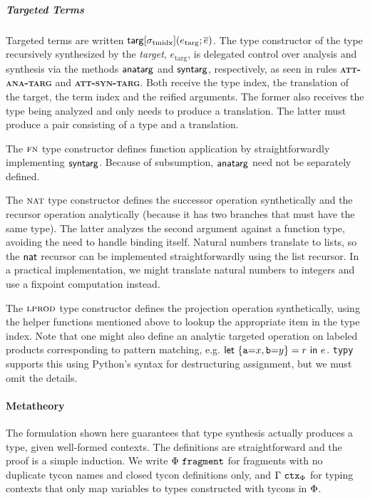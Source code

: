 \documentclass{sigplanconf}
\newcommand{\sigmat}[1]{\sigma_{\text{#1}}}
\newcommand{\FF}[1]{{\sf #1}}
\newcommand{\rulename}[1]{{\textsc{\textbf{#1}}}}
\begin{document}
\subparagraph{Targeted Terms} Targeted terms are written $\FF{targ}[\sigmat{tmidx}](e_\text{targ}; \overline{e})$. The type constructor of the type recursively synthesized by the \emph{target}, $e_\text{targ}$, is delegated control over analysis and synthesis via the methods $\FF{anatarg}$ and $\FF{syntarg}$, respectively, as seen in rules \rulename{att-ana-targ} and \rulename{att-syn-targ}. Both receive the type index, the translation of the target, the term index and the reified arguments. The former also receives the type being analyzed and only needs to produce a translation. The latter must produce a pair consisting of a type and a translation.

The $\textsc{fn}$ type constructor defines function application by straightforwardly implementing $\FF{syntarg}$.  Because of subsumption, $\FF{anatarg}$ need not be separately defined.

The $\textsc{nat}$ type constructor defines the successor operation synthetically and the recursor operation analytically (because it has two branches that must have the same type). The latter analyzes the second argument against a function type, avoiding the need to handle binding itself. Natural numbers translate to lists, so the $\FF{nat}$ recursor can be implemented straightforwardly using the list recursor. In a practical implementation, we might translate natural numbers to integers and use a fixpoint computation instead.

The $\textsc{lprod}$ type constructor defines the projection operation synthetically, using the helper functions mentioned above to lookup the appropriate item in the type index. Note that one might also define an analytic targeted operation on labeled products corresponding to pattern matching, e.g. $\FF{let}~\{\texttt{a}{=}x, \texttt{b}{=}y\}=r~\FF{in}~e$. \verb|typy| supports this using Python's syntax for destructuring assignment, but we must omit the details.

\paragraph{Metatheory} The formulation shown here guarantees that type synthesis actually produces a type, given well-formed contexts. The definitions are straightforward and the proof is a simple induction. We write $\Phi~\mathtt{fragment}$ for fragments with no duplicate tycon names and closed tycon definitions only, and $\Gamma~\mathtt{ctx}_\Phi$ for typing contexts that only map variables to types constructed with tycons in $\Phi$. %
\end{document}
